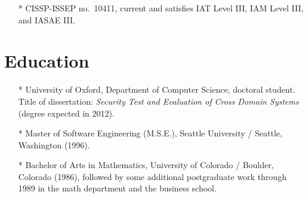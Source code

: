 \documentclass[letterpaper]{article}
\begin{document}
\begin{itemize}
	\item[*] CISSP-ISSEP no.\ 10411, current and satisfies IAT Level III, IAM Level III,
		and IASAE III.
\end{itemize}

\section*{Education}

\begin{itemize}
    \item[*] University of Oxford, Department of Computer Science,
		doctoral student.  Title of dissertation: \emph{Security Test and Evaluation
		of Cross Domain Systems} (degree expected in 2012).

    \item[*] Master of Software Engineering (M.S.E.), Seattle
		University / Seattle, Washington (1996).

    \item[*] Bachelor of Arts in Mathematics, University of
		Colorado / Boulder, Colorado (1986), followed by some additional
		postgraduate work through 1989 in the math department and the business school.
\end{itemize}
\end{document}
